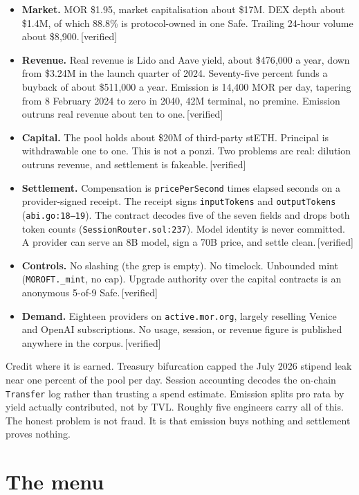 \documentclass[11pt,a4paper]{article}
\newcommand{\code}[1]{\texttt{\small #1}}
\newcommand{\lab}[1]{{\color{muted}\footnotesize\,[#1]}}
\begin{document}
\begin{itemize}
\item \textbf{Market.} MOR \$1.95, market capitalisation about \$17M. DEX depth
about \$1.4M, of which 88.8\% is protocol-owned in one Safe. Trailing 24-hour
volume about \$8{,}900.\lab{verified}
\item \textbf{Revenue.} Real revenue is Lido and Aave yield, about \$476{,}000 a
year, down from \$3.24M in the launch quarter of 2024. Seventy-five percent funds
a buyback of about \$511{,}000 a year. Emission is 14{,}400 MOR per day, tapering
from 8 February 2024 to zero in 2040, 42M terminal, no premine. Emission outruns
real revenue about ten to one.\lab{verified}
\item \textbf{Capital.} The pool holds about \$20M of third-party stETH.
Principal is withdrawable one to one. This is not a ponzi. Two problems are real:
dilution outruns revenue, and settlement is fakeable.\lab{verified}
\item \textbf{Settlement.} Compensation is \code{pricePerSecond} times elapsed
seconds on a provider-signed receipt. The receipt signs \code{inputTokens} and
\code{outputTokens} (\code{abi.go:18--19}). The contract decodes five of the
seven fields and drops both token counts (\code{SessionRouter.sol:237}). Model
identity is never committed. A provider can serve an 8B model, sign a 70B price,
and settle clean.\lab{verified}
\item \textbf{Controls.} No slashing (the grep is empty). No timelock. Unbounded
mint (\code{MOROFT.\_mint}, no cap). Upgrade authority over the capital contracts
is an anonymous 5-of-9 Safe.\lab{verified}
\item \textbf{Demand.} Eighteen providers on \code{active.mor.org}, largely
reselling Venice and OpenAI subscriptions. No usage, session, or revenue figure
is published anywhere in the corpus.\lab{verified}
\end{itemize}

Credit where it is earned. Treasury bifurcation capped the July 2026 stipend leak
near one percent of the pool per day. Session accounting decodes the on-chain
\code{Transfer} log rather than trusting a spend estimate. Emission splits pro
rata by yield actually contributed, not by TVL. Roughly five engineers carry all
of this. The honest problem is not fraud. It is that emission buys nothing and
settlement proves nothing.

\section*{The menu}
\end{document}
